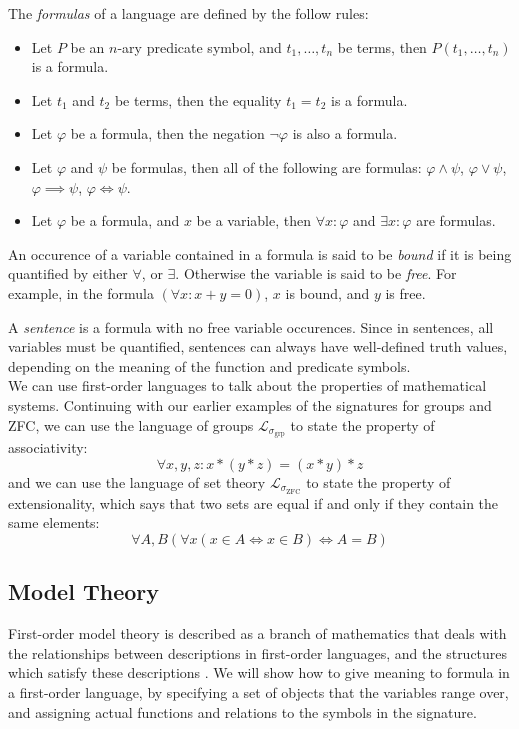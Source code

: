 \documentclass[12pt]{article}
\theoremstyle{definition}
\begin{document}
The \emph{formulas} of a language are defined by the follow rules:
\begin{itemize}
  \item Let $P$ be an $n$-ary predicate symbol, and $t_1,\ldots,t_n$ be terms, then $P(t_1,\ldots,t_n)$ is a formula.
  \item Let $t_1$ and $t_2$ be terms, then the equality $t_1 = t_2$ is a formula.
  \item Let $\varphi$ be a formula, then the negation $\neg\varphi$ is also a formula.
  \item Let $\varphi$ and $\psi$ be formulas, then all of the following are formulas: $\varphi\wedge\psi$, $\varphi\vee\psi$, $\varphi\implies\psi$, $\varphi\iff\psi$.
  \item Let $\varphi$ be a formula, and $x$ be a variable, then $\forall x:\varphi$ and $\exists x:\varphi$ are formulas.
\end{itemize}
An occurence of a variable contained in a formula is said to be \emph{bound} if it is being quantified by either $\forall$, or $\exists$.
Otherwise the variable is said to be \emph{free}. For example, in the formula $(\forall x: x+y=0)$, $x$ is bound, and $y$ is free.

A \emph{sentence} is a formula with no free variable occurences.
Since in sentences, all variables must be quantified, sentences can always have well-defined truth values, depending on the meaning of the function and predicate symbols.\\

We can use first-order languages to talk about the properties of mathematical systems.
Continuing with our earlier examples of the signatures for groups and ZFC, we can use the language of groups $\mathcal{L}_{\sigma_{\text{grp}}}$ to state the property of associativity:
$$\forall x,y,z: x*(y*z) = (x*y)*z$$
and we can use the language of set theory $\mathcal{L}_{\sigma_{\text{ZFC}}}$ to state the property of extensionality, which says that two sets are equal if and only if they contain the same elements:
$$\forall A,B (\forall x (x\in A \iff x\in B) \iff A = B)$$

\subsection{Model Theory}
First-order model theory is described as a branch of mathematics that deals with the relationships between descriptions in first-order languages, and the structures which satisfy these descriptions \cite{stanmodel}.
We will show how to give meaning to formula in a first-order language, by specifying a set of objects that the variables range over, and assigning actual functions and relations to the symbols in the signature.\\
\end{document}
